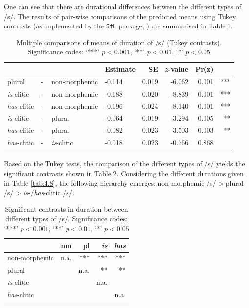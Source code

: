 One can see that there are durational differences between the different types of /s/. The results of pair-wise comparisons of the predicted means using Tukey contrasts (as implemented by the \texttt{SfL} package, \cite{Schmitz2021sfl}) are summarised in Table \ref{tab:4.6}.

\begin{table}\fontsize{10}{11}
\caption{Multiple comparisons of means of duration of /s/ (Tukey contrasts). Significance codes: `***' $p < 0.001$, `**' $p < 0.01$, `*' $p < 0.05$}
\label{tab:4.6}
\centering
\begin{tabular}{llllrrrr} 
\lsptoprule
~                   & ~ & ~                  & Estimate & SE    & \textit{z}-value & Pr(\textbar{}z\textbar{}) & ~    \\ 
\midrule
plural              & - & non-morphemic      & -0.114   & 0.019 & -6.062           & 
  0.001                  & ***  \\
\textit{is}-clitic  & - & non-morphemic      & -0.188   & 0.020 & -8.839           &  0.001                    & ***  \\
\textit{has}-clitic & - & non-morphemic      & -0.196   & 0.024 & -8.140           & 
  0.001                  & ***  \\
\textit{is}-clitic  & - & plural             & -0.064   & 0.019 & -3.294           & 0.005                     & **   \\
\textit{has}-clitic & - & plural             & -0.082   & 0.023 & -3.503           & 0.003                     & **   \\
\textit{has}-clitic & - & \textit{is}-clitic & -0.018   & 0.023 & -0.766           & 0.868                     & ~    \\
\lspbottomrule
\end{tabular}
\end{table}

Based on the Tukey tests, the comparison of the different types of /s/ yields the significant contrasts shown in Table \ref{tab:4.7}. Considering the different durations given in Table \ref{tab:4.8}, the following hierarchy emerges: non-morphemic /s/ > plural /s/ > \textit{is}-/\textit{has}-clitic /s/.

\begin{table}\fontsize{10}{11}
\caption{Significant contrasts in duration between different types of /s/. Significance codes: `***' $p < 0.001$, `**' $p < 0.01$, `*' $p < 0.05$}
\label{tab:4.7}
\centering
\begin{tabular}{lrrrr} 
\lsptoprule
~                   & nm   & pl   & \textit{is} & \textit{has}  \\ 
\midrule
non-morphemic       & n.a. & ***  & ***         & ***           \\
plural              & ~    & n.a. & **          & **            \\
\textit{is}-clitic  & ~    & ~    & n.a.        & ~             \\
\textit{has}-clitic & ~    & ~    & ~           & n.a.          \\
\lspbottomrule
\end{tabular}
\end{table}



